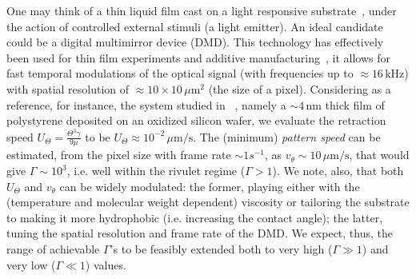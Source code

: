 One may think of a thin liquid film cast on a light responsive substrate~\cite{ichimuraLightDrivenMotionLiquids2000}, under the action of controlled external stimuli (a light emitter). 
An ideal candidate could be a digital multimirror device (DMD).
This technology has effectively been used for thin film experiments and additive manufacturing~\cite{vieyrasalasActiveControlEvaporative2012, sahaScalableSubmicrometerAdditive2019}, it allows for fast temporal modulations of the optical signal (with frequencies up to $\approx 16 \, \text{kHz}$) with spatial resolution of $\approx 10 \times 10 \, \mu \text{m}^2$ (the size of a pixel).
Considering as a reference, for instance, the system studied in ~\cite{beckerComplexDewettingScenarios2003,fetzerThermalNoiseInfluences2007}, namely a $\sim 4 \, \text{nm}$ thick film of polystyrene deposited on an oxidized silicon wafer, we evaluate the retraction speed $U_{\Theta} = \frac{\Theta^3 \gamma}{9 \mu}$ to be $U_{\Theta} \approx 10^{-2} \, \mu \text{m}/\text{s}$. 
The (minimum) \textit{pattern speed} can be estimated, from the pixel size with frame rate $\sim 1 s^{-1}$, as $v_{\theta} \sim 10 \, \mu \text{m}/\text{s}$, that would give $\Gamma \sim 10^3$, i.e. well within the rivulet regime ($\Gamma > 1$). 
We note, also, that both $U_{\Theta}$ and $v_{\theta}$ can be widely modulated: the former, playing either with the (temperature and molecular weight dependent) viscosity or tailoring the substrate to making it more hydrophobic (i.e. increasing the contact angle); the latter, tuning the spatial resolution and frame rate of the DMD. 
We expect, thus, the range of achievable $\Gamma$'s to be feasibly extended both to very high ($\Gamma \gg 1$) and very low ($\Gamma \ll 1$) values.\\

